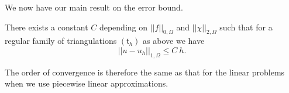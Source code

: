 We now have our main result on the error bound.

\begin{theorem}[FALK]\label{chap9-thm9.2}
There exists a constant $C$ depending on $||f||_{0,\Omega}$ and
$||\chi||_{2,\Omega}$ such that for a regular family of triangulations
$(\mathfrak{t}_{h})$ as above we have
\begin{equation*}
||u-u_{h}||_{1,\Omega}\leq C\ h.\tag{9.11}\label{chap9-eq9.11}
\end{equation*}
\end{theorem}

\begin{remark}\label{chap9-rem9.6}
The order of convergence is therefore the same as that for the linear
problems when we use piecewise linear approximations.
\end{remark}

